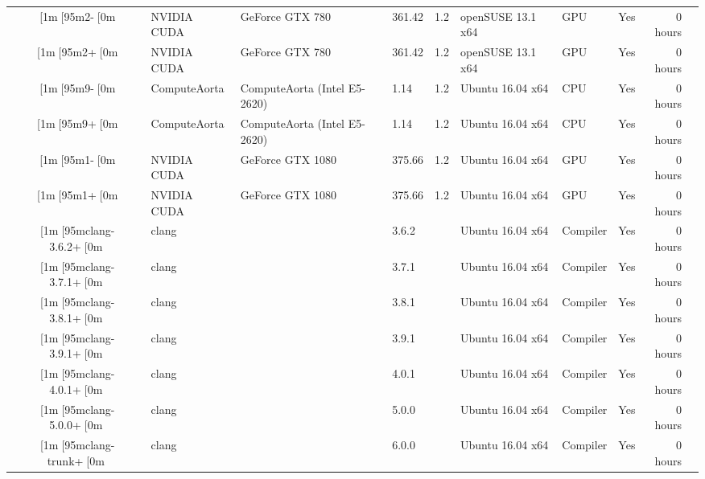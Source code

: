\begin{tabular}{ cllllllL{1cm} | rR{1.4cm} }
[1m[95m2-[0m & NVIDIA CUDA & GeForce GTX 780 & 361.42 & 1.2 & openSUSE 13.1 x64 & GPU & Yes & 0 hours \\
[1m[95m2+[0m & NVIDIA CUDA & GeForce GTX 780 & 361.42 & 1.2 & openSUSE 13.1 x64 & GPU & Yes & 0 hours \\
[1m[95m9-[0m & ComputeAorta & ComputeAorta (Intel E5-2620) & 1.14 & 1.2 & Ubuntu 16.04 x64 & CPU & Yes & 0 hours \\
[1m[95m9+[0m & ComputeAorta & ComputeAorta (Intel E5-2620) & 1.14 & 1.2 & Ubuntu 16.04 x64 & CPU & Yes & 0 hours \\
[1m[95m1-[0m & NVIDIA CUDA & GeForce GTX 1080 & 375.66 & 1.2 & Ubuntu 16.04 x64 & GPU & Yes & 0 hours \\
[1m[95m1+[0m & NVIDIA CUDA & GeForce GTX 1080 & 375.66 & 1.2 & Ubuntu 16.04 x64 & GPU & Yes & 0 hours \\
[1m[95mclang-3.6.2+[0m & clang &  & 3.6.2 &  & Ubuntu 16.04 x64 & Compiler & Yes & 0 hours \\
[1m[95mclang-3.7.1+[0m & clang &  & 3.7.1 &  & Ubuntu 16.04 x64 & Compiler & Yes & 0 hours \\
[1m[95mclang-3.8.1+[0m & clang &  & 3.8.1 &  & Ubuntu 16.04 x64 & Compiler & Yes & 0 hours \\
[1m[95mclang-3.9.1+[0m & clang &  & 3.9.1 &  & Ubuntu 16.04 x64 & Compiler & Yes & 0 hours \\
[1m[95mclang-4.0.1+[0m & clang &  & 4.0.1 &  & Ubuntu 16.04 x64 & Compiler & Yes & 0 hours \\
[1m[95mclang-5.0.0+[0m & clang &  & 5.0.0 &  & Ubuntu 16.04 x64 & Compiler & Yes & 0 hours \\
[1m[95mclang-trunk+[0m & clang &  & 6.0.0 &  & Ubuntu 16.04 x64 & Compiler & Yes & 0 hours \\

\bottomrule
\end{tabular}

